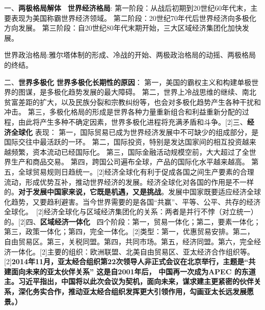 {{一、}{\textbf{两极格局解体~}}
\textbf{{世界经济格局}}{:}
{第一阶段：从战后初期到20世纪60年代末，主要表现为美国称霸世界经济领域。}
{第二阶段：20世纪70年代后世界经济向多极化方向发展。}
{第三阶段：自20世纪80年代末期开始，三大区域经济集团化加快发展。~}
}

{世界政治格局:雅尔塔体制的形成、冷战的开始、两极政治格局的动摇、两极格局的终结。}

{{}
{二、}{\textbf{世界多极化}}
{\textbf{世界多极化长期性的原因}}{：}
{第一，美国的霸权主义和构建单极世界的图谋，是多极化趋势发展的最大障碍。}
{第二，世界上冷战思维的继续、南北贫富差距的扩大，以及民族分裂和宗教纠纷等，也会对多极化趋势产生各种干扰和冲击。}
{第三，多极化格局的形成是世界各种力量重新组合和利益重新分配的过程，由此将产生多种不确定因素，世界多极化进程将充满矛盾和斗争。}[2\baselineskip]{三、}{\textbf{经济全球化}}
{表现：}
{第一，国际贸易已成为世界经济发展中不可缺少的组成部分，是国际交往中最活跃的一环。}
{第二，国际投资，特别是发达国家间的相互投资越来越频繁，资本流动已经国际化。}
{第三，国际金融活动规模空前，大大超过了全世界生产和商品交易。}
{第四，跨国公司遍布全球，产品的国际化水平越来越高。}
{第五，全球贸易规则日趋统一。}[2\baselineskip]{经济全球化有利于促成各国之间生产要素的合理流动，形成优势互补，推动世界经济的发展。经济全球化对各国的作用是不一样的。}{\textbf{对于发展中国家来说，它既是机遇，又是挑战}}{。发展中国家既要适应经济全球化趋势，又要趋利避害。当今世界需要的是各国``共赢''、平等、公平、共存的经济全球化。~}[2\baselineskip]{经济全球化与区域经济集团化的关系}{：两者是并行不悖（对立统一）的。}[2\baselineskip]{四、}{\textbf{区域经济一体化~}}
{四个阶段：第一，贸易一体化；第二，要素一体化；第三，政策一体化；第四，完全一体化。}[2\baselineskip]{类型：第一，优惠贸易安排。第二，自由贸易区。第三，关税同盟。第四，共同市场。第五，经济同盟。第六，完全经济一体化。}[2\baselineskip]{主要的组织：欧洲联盟、北美自由贸易区、亚太经济合作组织等。}[2\baselineskip]\textbf{2014年11月，亚太经合组织第22次领导人非正式会议在北京举行，主题是``共建面向未来的亚太伙伴关系''
这是自2001年后， 中国再一次成为APEC
的东道主。习近平指出，中国将以此次会议为契机，面向未来，谋求建主更紧密的伙伴关系，深化务实合作，推动亚太经合组织发挥更大引领作用，勾画亚太长远发展愿景。）~~}}
